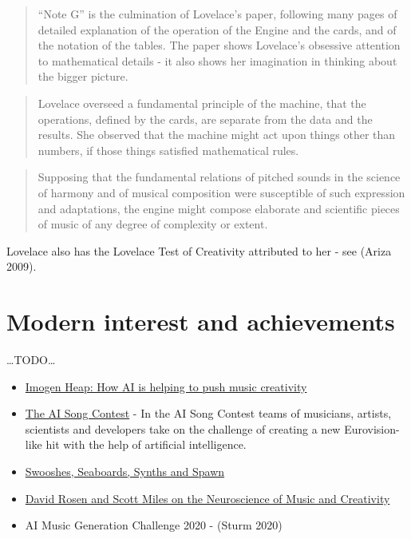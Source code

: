 \documentclass[12pt,a4paper,]{report}
\providecommand{\tightlist}{%
  \setlength{\itemsep}{0pt}\setlength{\parskip}{0pt}}
\begin{document}
\begin{quote}
``Note G'' is the culmination of Lovelace's paper, following many pages
of detailed explanation of the operation of the Engine and the cards,
and of the notation of the tables. The paper shows Lovelace's obsessive
attention to mathematical details - it also shows her imagination in
thinking about the bigger picture.
\end{quote}

\begin{quote}
Lovelace overseed a fundamental principle of the machine, that the
operations, defined by the cards, are separate from the data and the
results. She observed that the machine might act upon things other than
numbers, if those things satisfied mathematical rules.
\end{quote}

\begin{quote}
Supposing that the fundamental relations of pitched sounds in the
science of harmony and of musical composition were susceptible of such
expression and adaptations, the engine might compose elaborate and
scientific pieces of music of any degree of complexity or extent.
\end{quote}

Lovelace also has the Lovelace Test of Creativity attributed to her -
see (Ariza 2009).

\hypertarget{modern-interest-and-achievements}{%
\section{Modern interest and
achievements}\label{modern-interest-and-achievements}}

\ldots TODO\ldots{}

\begin{itemize}
\tightlist
\item
  \href{https://www.bbc.co.uk/news/av/technology-52236563}{Imogen Heap:
  How AI is helping to push music creativity}
\item
  \href{https://www.vprobroadcast.com/titles/ai-songcontest.html}{The AI
  Song Contest} - In the AI \hspace{0pt}\hspace{0pt}Song Contest teams
  of musicians, artists, scientists and developers take on the challenge
  of creating a new Eurovision-like hit with the help of artificial
  intelligence.
\item
  \href{https://www.bbc.co.uk/programmes/m000cngg}{Swooshes, Seaboards,
  Synths and Spawn}
\item
  \href{https://overcast.fm/+S_7no2kwM}{David Rosen and Scott Miles on
  the Neuroscience of Music and Creativity}
\item
  AI Music Generation Challenge 2020 - (Sturm 2020)
\end{itemize}
\end{document}
